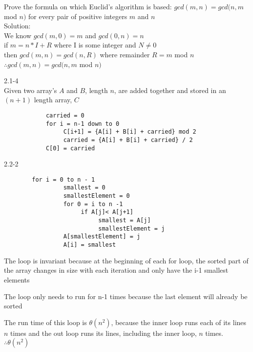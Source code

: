 \documentclass[12pt,largemargins]{homework}
\begin{document}
    \begin{arabicparts}

      \item
        Prove the formula on which Euclid's algorithm is based:
        $gcd(m,n)=gcd(n,m$ mod $ n)$ for every pair of positive integers $m$ and $n$\\
        Solution: \\
        We know $gcd(m,0)=m$ and $gcd(0,n)=n$\\
        if $m = n * I + R$ where I is some integer and $N \neq 0$\\
        then $gcd(m,n) = gcd(n,R)$ where remainder $R=m$ mod $n$ \\
        $\therefore gcd(m,n)=gcd(n,m$ mod $n)$
	
    
      \item
        2.1-4\\ Given two array's $A$ and $B$, length $n$, are added together and stored in an $(n+1)$ length array, $C$
        \begin{verbatim}
			carried = 0 
			for i = n-1 down to 0 
			     C[i+1] = {A[i] + B[i] + carried} mod 2
			     carried = {A[i] + B[i] + carried} / 2 
			C[0] = carried
        \end{verbatim}
       		

		\item
		2.2-2
		\begin{alphaparts}
		\item
		\begin{verbatim}
		for i = 0 to n - 1
			     smallest = 0
			     smallestElement = 0
			     for 0 = i to n -1
			          if A[j]< A[j+1]
			               smallest = A[j]
			               smallestElement = j
			     A[smallestElement] = j
			     A[i] = smallest
		\end{verbatim}
		\item
		The loop is invariant because at the beginning of each for loop, the 
		sorted part of the array changes in size with each iteration and only have the i-1 smallest elements 
		\item
		The loop only needs to run for n-1 times because the last element will already be sorted
		\item
		The run time of this loop is $\theta (n^2)$, because the inner loop runs each of its lines $n$ times and the out loop runs its lines, including the inner loop, $n$ times. $\therefore \theta(n^2)$

		\end{alphaparts}
\end{arabicparts}
\end{document}
